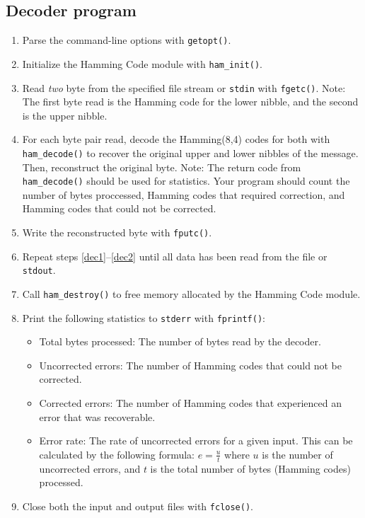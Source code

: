 \documentclass[11pt]{article}
\begin{document}
\subsection{Decoder program}
\begin{enumerate}
    \item Parse the command-line options with \texttt{getopt()}.
    \item Initialize the Hamming Code module with \texttt{ham\_init()}.
    \item Read \emph{two} byte from the specified file stream or \texttt{stdin} with \texttt{fgetc()}. \label{dec1}
    Note: The first byte read is the Hamming code for the lower nibble, and the second is the upper nibble.
    \item For each byte pair read, decode the Hamming(8,4) codes for both with \texttt{ham\_decode()}
    to recover the original upper and lower nibbles of the message. Then, reconstruct the original byte.
    Note: The return code from \texttt{ham\_decode()} should be used for statistics. Your program should
    count the number of bytes proccessed, Hamming codes that required correction, and Hamming codes
    that could not be corrected.
    \item Write the reconstructed byte with \texttt{fputc()}. \label{dec2}
    \item Repeat steps \ref{dec1}--\ref{dec2} until all data has been read from the file or \texttt{stdout}.
    \item Call \texttt{ham\_destroy()} to free memory allocated by the Hamming Code module.
    \item Print the following statistics to \texttt{stderr} with \texttt{fprintf()}:
    \begin{itemize}
        \item Total bytes processed: The number of bytes read by the decoder.
        \item Uncorrected errors: The number of Hamming codes that could not be corrected.
        \item Corrected errors: The number of Hamming codes that experienced an error that
        was recoverable.
        \item Error rate: The rate of uncorrected errors for a given input. This can be calculated
        by the following formula: $e = \frac{u}{t}$ where $u$ is the number of uncorrected errors, and
        $t$ is the total number of bytes (Hamming codes) processed.
    \end{itemize}
    \item Close both the input and output files with \texttt{fclose()}.
\end{enumerate}
\end{document}
